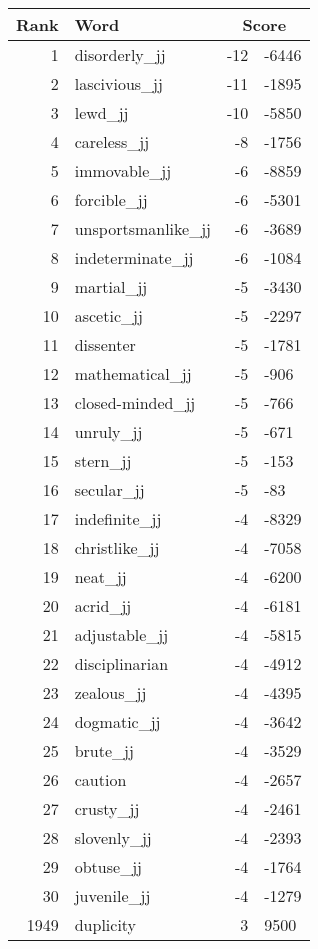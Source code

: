 \begin{longtable}[!htbp]{| rlr@{.}l |}
    \hline
    \textbf{Rank} & \textbf{Word} & \multicolumn{2}{c|}{\textbf{Score}} \\
    \hline
    \endhead
    1 & disorderly\_jj & -12 & -6446 \\
    2 & lascivious\_jj & -11 & -1895 \\
    3 & lewd\_jj & -10 & -5850 \\
    4 & careless\_jj & -8 & -1756 \\
    5 & immovable\_jj & -6 & -8859 \\
    6 & forcible\_jj & -6 & -5301 \\
    7 & unsportsmanlike\_jj & -6 & -3689 \\
    8 & indeterminate\_jj & -6 & -1084 \\
    9 & martial\_jj & -5 & -3430 \\
    10 & ascetic\_jj & -5 & -2297 \\
    11 & dissenter & -5 & -1781 \\
    12 & mathematical\_jj & -5 & -906 \\
    13 & closed-minded\_jj & -5 & -766 \\
    14 & unruly\_jj & -5 & -671 \\
    15 & stern\_jj & -5 & -153 \\
    16 & secular\_jj & -5 & -83 \\
    17 & indefinite\_jj & -4 & -8329 \\
    18 & christlike\_jj & -4 & -7058 \\
    19 & neat\_jj & -4 & -6200 \\
    20 & acrid\_jj & -4 & -6181 \\
    21 & adjustable\_jj & -4 & -5815 \\
    22 & disciplinarian & -4 & -4912 \\
    23 & zealous\_jj & -4 & -4395 \\
    24 & dogmatic\_jj & -4 & -3642 \\
    25 & brute\_jj & -4 & -3529 \\
    26 & caution & -4 & -2657 \\
    27 & crusty\_jj & -4 & -2461 \\
    28 & slovenly\_jj & -4 & -2393 \\
    29 & obtuse\_jj & -4 & -1764 \\
    30 & juvenile\_jj & -4 & -1279 \\
    1949 & duplicity & 3 & 9500 \\

\end{longtable}
